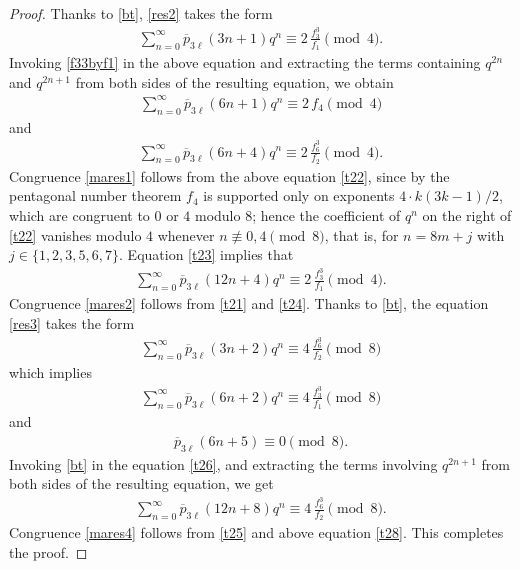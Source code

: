 \documentclass[11pt, reqno]{amsart}
\numberwithin{equation}{section}
\begin{document}
	\begin{proof}
		Thanks to \eqref{bt}, \eqref{res2} takes the form
		\begin{align}\label{t21}
			\sum_{n=0}^{\infty}\overline{p}_{3\ell}(3n+1)q^n\equiv
			2\,\frac{f_{3}^3}{f_1}\pmod{4}.
		\end{align}
		Invoking \eqref{f33byf1} in the above equation and extracting the terms containing $q^{2n}$ and $q^{2n+1}$ from both sides of the resulting equation, we obtain
		\begin{align}\label{t22}
			\sum_{n=0}^{\infty}\overline{p}_{3\ell}(6n+1)q^n\equiv
			2\,f_4\pmod{4}
		\end{align} and 
		\begin{align}\label{t23}
			\sum_{n=0}^{\infty}\overline{p}_{3\ell}(6n+4)q^n\equiv
			2\,\frac{f_{6}^3}{f_2}\pmod{4}.
		\end{align}
		Congruence \eqref{mares1} follows from the above equation \eqref{t22}, since by the pentagonal number theorem $f_4$ is supported only on exponents $4\cdot k(3k-1)/2$, which are congruent to $0$ or $4$ modulo $8$; hence the coefficient of $q^n$ on the right of \eqref{t22} vanishes modulo $4$ whenever $n\not\equiv0,4\pmod8$, that is, for $n=8m+j$ with $j\in\{1,2,3,5,6,7\}$. Equation \eqref{t23} implies that
		\begin{align}\label{t24}
			\sum_{n=0}^{\infty}\overline{p}_{3\ell}(12n+4)q^n\equiv
			2\,\frac{f_{3}^3}{f_1}\pmod{4}.
		\end{align}
		Congruence \eqref{mares2} follows from \eqref{t21} and \eqref{t24}. Thanks to \eqref{bt}, the equation \eqref{res3} takes the form
		\begin{align}\label{t25}
			\sum_{n=0}^{\infty}\overline{p}_{3\ell}(3n+2)q^n\equiv
			4\,\frac{f_{6}^3}{f_2}\pmod{8}
		\end{align}
		which implies
		\begin{align}\label{t26}
			\sum_{n=0}^{\infty}\overline{p}_{3\ell}(6n+2)q^n\equiv
			4\,\frac{f_3^3}{f_{1}}\pmod{8}
		\end{align}
		and
		\begin{align}\label{t27}
			\overline{p}_{3\ell}(6n+5)\equiv0\pmod{8}.
		\end{align}
		Invoking \eqref{bt} in the equation \eqref{t26}, and extracting the terms involving $q^{2n+1}$ from both sides of the resulting equation, we get
		\begin{align}\label{t28}
			\sum_{n=0}^{\infty}\overline{p}_{3\ell}(12n+8)q^n\equiv
			4\,\frac{f_{6}^3}{f_2}\pmod{8}.
		\end{align}
		Congruence \eqref{mares4} follows from \eqref{t25} and above equation \eqref{t28}. This completes the proof.
	\end{proof}
	
\end{document}
